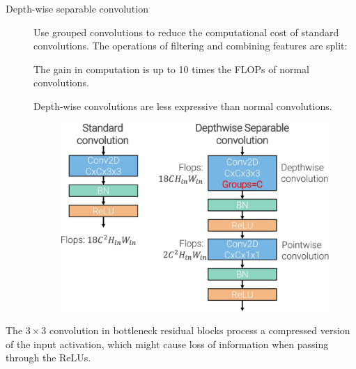 \begin{description}
    \item[Depth-wise separable convolution]  
        Use grouped convolutions to reduce the computational cost of standard convolutions. The operations of filtering and combining features are split:

        \begin{remark}
            The gain in computation is up to 10 times the FLOPs of normal convolutions.
        \end{remark}

        \begin{remark}
            Depth-wise convolutions are less expressive than normal convolutions.
        \end{remark}

        \begin{figure}[H]
            \centering
            \includegraphics[width=0.45\linewidth]{./img/_depthwise_conv.jpg}
        \end{figure}
\end{description}

\begin{remark}
    The $3 \times 3$ convolution in bottleneck residual blocks process a compressed version of the input activation, which might cause loss of information when passing through the ReLUs.
\end{remark}

